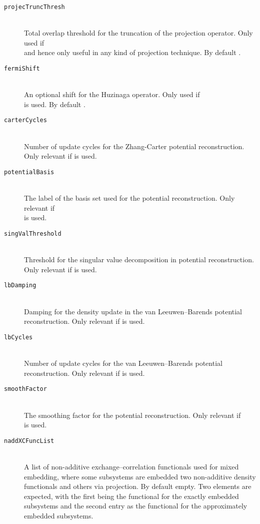 \begin{description}
  \item [\texttt{projecTruncThresh}]\hfill \\
    Total overlap threshold for the truncation of the projection operator. Only used if \\
     and hence only useful in any kind of projection technique.
    By default .
  \item [\texttt{fermiShift}]\hfill \\
    An optional shift for the Huzinaga operator. Only used if\\  is
    used. By default .
  \item [\texttt{carterCycles}]\hfill \\
    Number of update cycles for the Zhang-Carter potential reconstruction. Only relevant if
     is used.
  \item [\texttt{potentialBasis}]\hfill \\
    The label of the basis set used for the potential reconstruction. Only relevant if\\
     is used.
  \item [\texttt{singValThreshold}]\hfill \\
    Threshold for the singular value decomposition in potential reconstruction. Only relevant if
     is used.
  \item [\texttt{lbDamping}]\hfill \\
    Damping for the density update in the van Leeuwen--Barends potential reconstruction. Only relevant if
     is used.
  \item [\texttt{lbCycles}]\hfill \\
    Number of update cycles for the van Leeuwen--Barends potential reconstruction. Only relevant if
     is used.
  \item [\texttt{smoothFactor}]\hfill \\
    The smoothing factor for the potential reconstruction. Only relevant if\\
     is used.
  \item [\texttt{naddXCFuncList}]\hfill \\
    A list of non-additive exchange--correlation functionals used for mixed embedding, where some subsystems are embedded two non-additive density functionals and others via projection. By default empty. Two elements are expected, with the first being the functional for the exactly embedded subsystems and the second entry as the functional for the approximately embedded subsystems.

\end{description}
